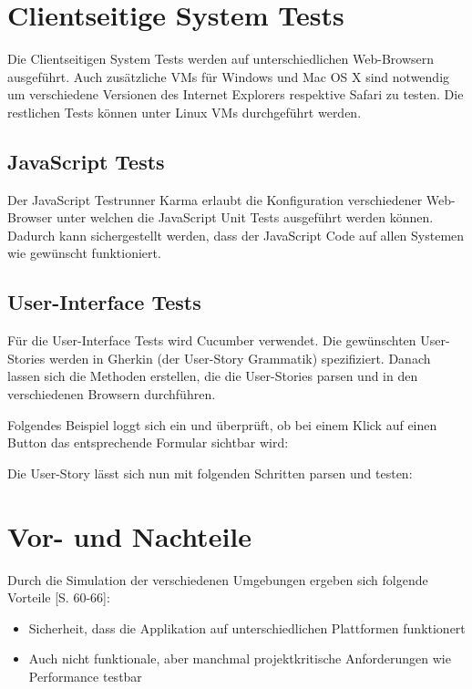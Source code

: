 \documentclass[a4paper,bibtotoc,oneside]{scrbook}
\begin{document}
\section{Clientseitige System Tests}
Die Clientseitigen System Tests werden auf unterschiedlichen Web-Browsern ausgeführt. Auch zusätzliche VMs für Windows und Mac OS X sind notwendig um verschiedene Versionen des Internet Explorers respektive Safari zu testen. Die restlichen Tests können unter Linux VMs durchgeführt werden.

\subsection{JavaScript Tests}
Der JavaScript Testrunner Karma erlaubt die Konfiguration verschiedener Web-Browser unter welchen die JavaScript Unit Tests ausgeführt werden können. Dadurch kann sichergestellt werden, dass der JavaScript Code auf allen Systemen wie gewünscht funktioniert.

\subsection{User-Interface Tests}
Für die User-Interface Tests wird Cucumber verwendet. Die gewünschten User-Stories werden in Gherkin (der User-Story Grammatik) spezifiziert. Danach lassen sich die Methoden erstellen, die die User-Stories parsen und in den verschiedenen Browsern durchführen.

Folgendes Beispiel loggt sich ein und überprüft, ob bei einem Klick auf einen Button das entsprechende Formular sichtbar wird:



Die User-Story lässt sich nun mit folgenden Schritten parsen und testen:



\section{Vor- und Nachteile}
Durch die Simulation der verschiedenen Umgebungen ergeben sich folgende Vorteile \cite{test_large_systems}[S. 60-66]:

\begin{itemize}
  \item Sicherheit, dass die Applikation auf unterschiedlichen Plattformen funktionert
  \item Auch nicht funktionale, aber manchmal projektkritische Anforderungen wie Performance testbar
\end{itemize}
\end{document}
